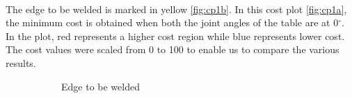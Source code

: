 \\
The edge to be welded is marked in yellow \ref{fig:cp1b}. In this cost plot \ref{fig:cp1a}, the minimum cost is obtained when both the joint angles of the table are at 0$^{\circ}$. In the plot, red represents a higher cost region while blue represents lower cost. The cost values were scaled from 0 to 100 to enable us to compare the various results.

\begin{figure}[!htbp] %
	\centering
	\begin{subfigure}[b]{0.4\textwidth}
		\caption{Edge to be welded}  
		\label{fig:cp2b}
	\end{subfigure}
	\begin{subfigure}[b]{0.4\textwidth}

\end{subfigure}
\end{figure}
